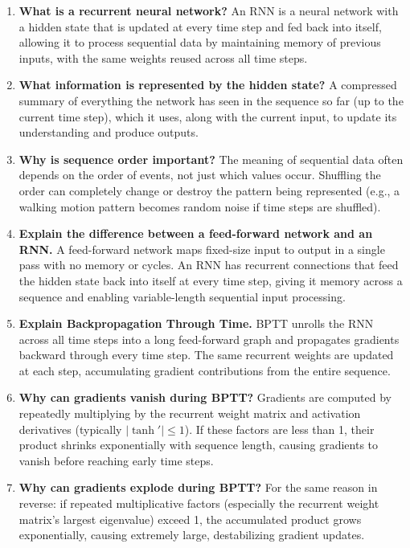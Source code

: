 \documentclass[10pt]{article}
\begin{document}
\begin{enumerate}
\item \textbf{What is a recurrent neural network?}
An RNN is a neural network with a hidden state that is updated at every time step and fed back into itself, 
allowing it to process sequential data by maintaining memory of previous inputs, with the same weights 
reused across all time steps.

\item \textbf{What information is represented by the hidden state?}
A compressed summary of everything the network has seen in the sequence so far (up to the current time step), 
which it uses, along with the current input, to update its understanding and produce outputs.

\item \textbf{Why is sequence order important?}
The meaning of sequential data often depends on the order of events, not just which values occur. Shuffling 
the order can completely change or destroy the pattern being represented (e.g., a walking motion pattern 
becomes random noise if time steps are shuffled).

\item \textbf{Explain the difference between a feed-forward network and an RNN.}
A feed-forward network maps fixed-size input to output in a single pass with no memory or cycles. An RNN 
has recurrent connections that feed the hidden state back into itself at every time step, giving it memory 
across a sequence and enabling variable-length sequential input processing.

\item \textbf{Explain Backpropagation Through Time.}
BPTT unrolls the RNN across all time steps into a long feed-forward graph and propagates gradients backward 
through every time step. The same recurrent weights are updated at each step, accumulating gradient 
contributions from the entire sequence.

\item \textbf{Why can gradients vanish during BPTT?}
Gradients are computed by repeatedly multiplying by the recurrent weight matrix and activation derivatives 
(typically $|\tanh'| \leq 1$). If these factors are less than 1, their product shrinks exponentially with 
sequence length, causing gradients to vanish before reaching early time steps.

\item \textbf{Why can gradients explode during BPTT?}
For the same reason in reverse: if repeated multiplicative factors (especially the recurrent weight matrix's 
largest eigenvalue) exceed 1, the accumulated product grows exponentially, causing extremely large, 
destabilizing gradient updates.


\end{enumerate}
\end{document}
